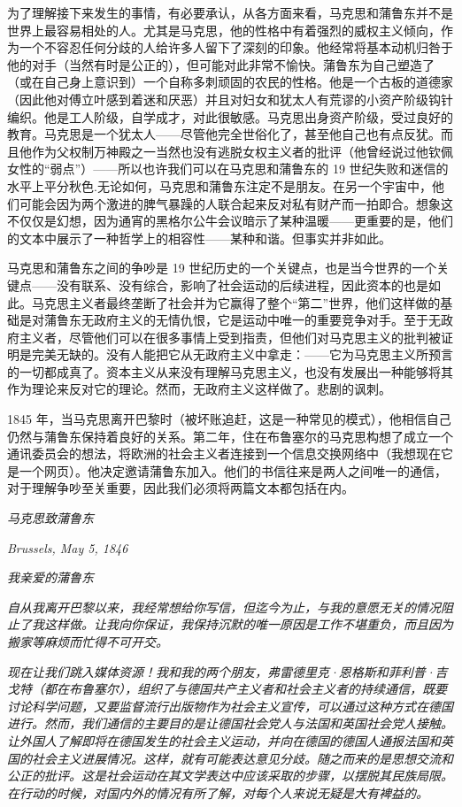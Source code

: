 \documentclass[DIV=12,%
               BCOR=0mm,%
               headinclude=false,%
               footinclude=false,open=any,%
               fontsize=10pt,%
               oneside,%
               paper=210mm:11in]%
               {scrbook}
\begin{document}
为了理解接下来发生的事情，有必要承认，从各方面来看，马克思和蒲鲁东并不是世界上最容易相处的人。尤其是马克思，他的性格中有着强烈的威权主义倾向，作为一个不容忍任何分歧的人给许多人留下了深刻的印象。他经常将基本动机归咎于他的对手（当然有时是公正的），但可能对此非常不愉快。蒲鲁东为自己塑造了（或在自己身上意识到）一个自称多刺顽固的农民的性格。他是一个古板的道德家（因此他对傅立叶感到着迷和厌恶）并且对妇女和犹太人有荒谬的小资产阶级钩针编织。他是工人阶级，自学成才，对此很敏感。马克思出身资产阶级，受过良好的教育。马克思是一个犹太人——尽管他完全世俗化了，甚至他自己也有点反犹。而且他作为父权制万神殿之一当然也没有逃脱女权主义者的批评（他曾经说过他钦佩女性的“弱点”）——所以也许我们可以在马克思和蒲鲁东的 19 世纪失败和迷信的水平上平分秋色.无论如何，马克思和蒲鲁东注定不是朋友。在另一个宇宙中，他们可能会因为两个激进的脾气暴躁的人联合起来反对私有财产而一拍即合。想象这不仅仅是幻想，因为通宵的黑格尔公牛会议暗示了某种温暖——更重要的是，他们的文本中展示了一种哲学上的相容性——某种和谐。但事实并非如此。


马克思和蒲鲁东之间的争吵是 19 世纪历史的一个关键点，也是当今世界的一个关键点——没有联系、没有综合，影响了社会运动的后续进程，因此资本的也是如此。马克思主义者最终垄断了社会并为它赢得了整个“第二”世界，他们这样做的基础是对蒲鲁东无政府主义的无情仇恨，它是运动中唯一的重要竞争对手。至于无政府主义者，尽管他们可以在很多事情上受到指责，但他们对马克思主义的批判被证明是完美无缺的。没有人能把它从无政府主义中拿走：——它为马克思主义所预言的一切都成真了。资本主义从来没有理解马克思主义，也没有发展出一种能够将其作为理论来反对它的理论。然而，无政府主义这样做了。悲剧的讽刺。


1845 年，当马克思离开巴黎时（被坏账追赶，这是一种常见的模式），他相信自己仍然与蒲鲁东保持着良好的关系。第二年，住在布鲁塞尔的马克思构想了成立一个通讯委员会的想法，将欧洲的社会主义者连接到一个信息交换网络中（我想现在它是一个网页）。他决定邀请蒲鲁东加入。他们的书信往来是两人之间唯一的通信，对于理解争吵至关重要，因此我们必须将两篇文本都包括在内。


\emph{马克思致蒲鲁东}


\emph{Brussels, May 5, 1846}


\emph{我亲爱的蒲鲁东}


\emph{自从我离开巴黎以来，我经常想给你写信，但迄今为止，与我的意愿无关的情况阻止了我这样做。让我向你保证，我保持沉默的唯一原因是工作不堪重负，而且因为搬家等麻烦而忙得不可开交。}


\emph{现在让我们跳入媒体资源！我和我的两个朋友，弗雷德里克·恩格斯和菲利普·吉戈特（都在布鲁塞尔），组织了与德国共产主义者和社会主义者的持续通信，既要讨论科学问题，又要监督流行出版物作为社会主义宣传，可以通过这种方式在德国进行。然而，我们通信的主要目的是让德国社会党人与法国和英国社会党人接触。让外国人了解即将在德国发生的社会主义运动，并向在德国的德国人通报法国和英国的社会主义进展情况。这样，就有可能表达意见分歧。随之而来的是思想交流和公正的批评。这是社会运动在其文学表达中应该采取的步骤，以摆脱其民族局限。在行动的时候，对国内外的情况有所了解，对每个人来说无疑是大有裨益的。}
\end{document}
